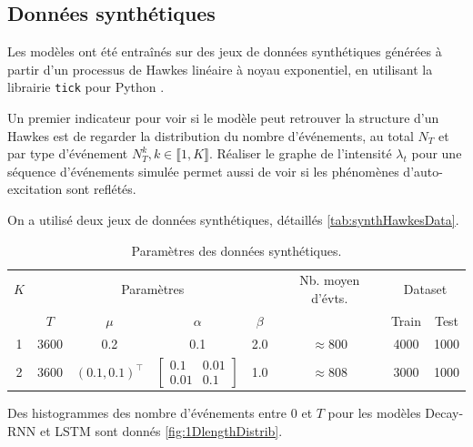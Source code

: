 \documentclass[../main.tex]{subfiles}
\begin{document}
\subsection{Données synthétiques}\label{ssec:synthResults}

Les modèles ont été entraînés sur des jeux de données synthétiques générées à partir d'un processus de Hawkes linéaire à noyau exponentiel, en utilisant la librairie \verb|tick| pour Python \cite{2017arXiv170703003B}.

Un premier indicateur pour voir si le modèle peut retrouver la structure d'un Hawkes est de regarder la distribution du nombre d'événements, au total $N_T$ et par type d'événement $N^k_T, k\in\llbracket 1,K\rrbracket$. Réaliser le graphe de l'intensité $\lambda_t$ pour une séquence d'événements simulée permet aussi de voir si les phénomènes d'auto-excitation sont reflétés.

On a utilisé deux jeux de données synthétiques, détaillés \autoref{tab:synthHawkesData}.

\begin{table}[h]
	\centering
	\begin{tabular}{@{}cccccccc}
		\toprule
		$K$ & \multicolumn{4}{c}{Paramètres} & Nb. moyen d'évts. & \multicolumn{2}{c}{Dataset} \\ \cmidrule(r){2-5}\cmidrule(r){7-8}
		    & $T$ & $\mu$ & $\alpha$ & $\beta$ & & Train & Test\\ \midrule
		1 & 3600 & 0.2 & 0.1 & 2.0 & $\approx 800$ & 4000 & 1000 \\ \midrule
		2 & 3600 & $(0.1, 0.1)^\intercal$ & $\begin{bmatrix}0.1 & 0.01\\0.01 &0.1\end{bmatrix}$ & 1.0 & $\approx 808$ & 3000 & 1000\\
		\bottomrule
	\end{tabular}
	\caption{Paramètres des données synthétiques.}\label{tab:synthHawkesData}
\end{table}

Des histogrammes des nombre d'événements entre $0$ et $T$ pour les modèles Decay-RNN et LSTM sont donnés \autoref{fig:1DlengthDistrib}.
\end{document}
